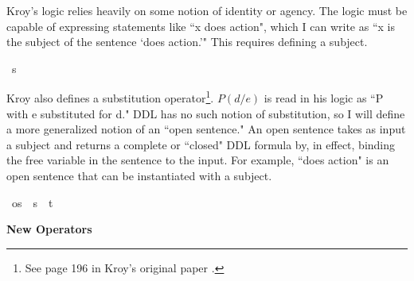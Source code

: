 \begin{isabellebody}
%
\endisadelimdocument
%
\begin{isamarkuptext}%
Kroy's logic relies heavily on some notion of identity or agency. The logic must be capable of 
expressing statements like ``x does action", which I can write as ``x is the subject of the sentence
 `does action.'" This requires defining a subject.%
\end{isamarkuptext}\isamarkuptrue%
\isamarkupfalse%
\ s\ %
%
\begin{isamarkuptext}%
Kroy also defines a substitution operator\footnote{See page 196 in Kroy's original paper \cite{kroy}.}. $P (d/e)$ is read in his logic as ``P with e substituted 
for d." DDL has no such notion of substitution, so I will define a more generalized notion of an ``open 
sentence." An open sentence takes as input a subject and returns a complete or ``closed" DDL formula by, 
in effect, binding the free variable in the sentence to the input. For example, 
``does action" is an open sentence that can be instantiated with a subject.%
\end{isamarkuptext}\isamarkuptrue%
\isamarkupfalse%
\ os\ {\isacharequal}\ {\isachardoublequoteopen}{\isacharparenleft}s\ {\isasymRightarrow}\ t{\isacharparenright}{\isachardoublequoteclose}\isanewline
%
\isanewline
%
%
\begin{isamarkuptext}%
\textbf{New Operators}


\end{isamarkuptext}
\end{isabellebody}
